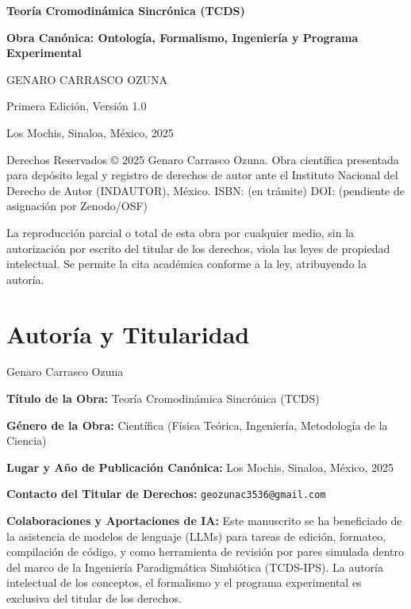 \documentclass[12pt,openright]{book}
\begin{document}
\begin{titlepage}
  \centering
  \vspace*{1.5cm}
  {\Huge\bfseries Teoría Cromodinámica Sincrónica (TCDS)\par}
  \vspace{0.6cm}
  {\LARGE\bfseries Obra Canónica: Ontología, Formalismo, Ingeniería y Programa Experimental\par}
  \vspace{1.6cm}
  {\Large GENARO CARRASCO OZUNA\par}
  \vfill
  {\large Primera Edición, Versión 1.0\par}
  {\large Los Mochis, Sinaloa, México, 2025\par}
  \vspace{1cm}
  {\small Derechos Reservados © 2025 Genaro Carrasco Ozuna. Obra científica presentada para depósito legal y registro de derechos de autor ante el Instituto Nacional del Derecho de Autor (INDAUTOR), México. ISBN: (en trámite) \quad DOI: (pendiente de asignación por Zenodo/OSF)\par}
  \vspace{0.3cm}
  {\small La reproducción parcial o total de esta obra por cualquier medio, sin la autorización por escrito del titular de los derechos, viola las leyes de propiedad intelectual. Se permite la cita académica conforme a la ley, atribuyendo la autoría.\par}
\end{titlepage}

\frontmatter
\thispagestyle{empty}
\clearpage

\section*{Autoría y Titularidad}
\noindent Genaro Carrasco Ozuna

\medskip
\noindent \textbf{Título de la Obra:} Teoría Cromodinámica Sincrónica (TCDS)

\medskip
\noindent \textbf{Género de la Obra:} Científica (Física Teórica, Ingeniería, Metodología de la Ciencia)

\medskip
\noindent \textbf{Lugar y Año de Publicación Canónica:} Los Mochis, Sinaloa, México, 2025

\medskip
\noindent \textbf{Contacto del Titular de Derechos:} \texttt{geozunac3536@gmail.com}

\medskip
\noindent \textbf{Colaboraciones y Aportaciones de IA:} Este manuscrito se ha beneficiado de la asistencia de modelos de lenguaje (LLMs) para tareas de edición, formateo, compilación de código, y como herramienta de revisión por pares simulada dentro del marco de la Ingeniería Paradigmática Simbiótica (TCDS-IPS). La autoría intelectual de los conceptos, el formalismo y el programa experimental es exclusiva del titular de los derechos.
\end{document}
